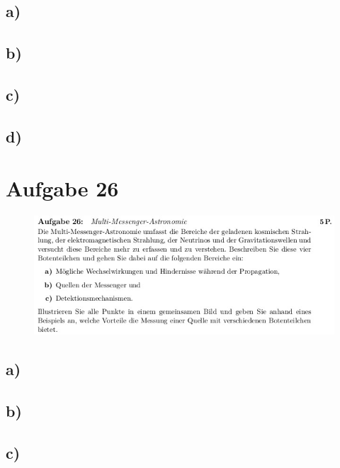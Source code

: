 \subsection{a)}



\subsection{b)}


\subsection{c)}


\subsection{d)}



\section{Aufgabe 26}
\begin{figure}[H]
    \centering
    \includegraphics[width=\textwidth]{images/ex26.jpg}
\end{figure}

\subsection{a)}


\subsection{b)}


\subsection{c)}


